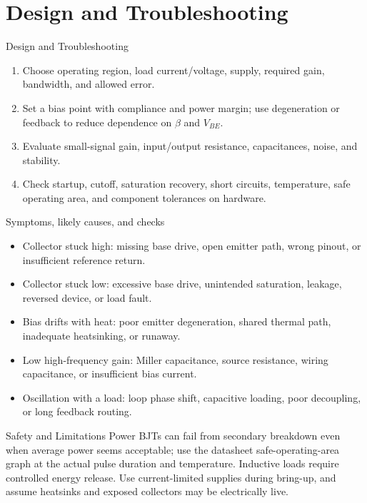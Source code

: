 \documentclass[10pt,letterpaper]{article}
\begin{document}
\section{Design and Troubleshooting}
\begin{CornellExamBox}{Design and Troubleshooting}
\begin{enumerate}
  \item Choose operating region, load current/voltage, supply, required gain, bandwidth, and allowed error.
  \item Set a bias point with compliance and power margin; use degeneration or feedback to reduce dependence on $\beta$ and $V_{BE}$.
  \item Evaluate small-signal gain, input/output resistance, capacitances, noise, and stability.
  \item Check startup, cutoff, saturation recovery, short circuits, temperature, safe operating area, and component tolerances on hardware.
\end{enumerate}\end{CornellExamBox}
\begin{CornellExamBox}{Symptoms, likely causes, and checks}
\begin{itemize}
  \item Collector stuck high: missing base drive, open emitter path, wrong pinout, or insufficient reference return.
  \item Collector stuck low: excessive base drive, unintended saturation, leakage, reversed device, or load fault.
  \item Bias drifts with heat: poor emitter degeneration, shared thermal path, inadequate heatsinking, or runaway.
  \item Low high-frequency gain: Miller capacitance, source resistance, wiring capacitance, or insufficient bias current.
  \item Oscillation with a load: loop phase shift, capacitive loading, poor decoupling, or long feedback routing.
\end{itemize}\end{CornellExamBox}
\begin{CornellWarningBox}{Safety and Limitations}
Power BJTs can fail from secondary breakdown even when average power seems acceptable; use the datasheet safe-operating-area graph at the actual pulse duration and temperature. Inductive loads require controlled energy release. Use current-limited supplies during bring-up, and assume heatsinks and exposed collectors may be electrically live.
\end{CornellWarningBox}
\end{document}

